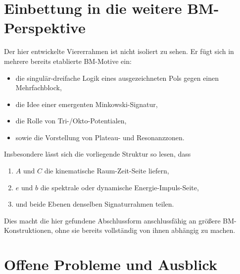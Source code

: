 \documentclass[11pt,a4paper]{article}
\theoremstyle{definition}
\theoremstyle{plain}
\begin{document}
	\section{Einbettung in die weitere BM-Perspektive}
	
	Der hier entwickelte Viererrahmen ist nicht isoliert zu sehen. Er fügt sich in mehrere bereits etablierte BM-Motive ein:
	\begin{itemize}[leftmargin=2em]
		\item die singulär-dreifache Logik eines ausgezeichneten Pols gegen einen Mehrfachblock,
		\item die Idee einer emergenten Minkowski-Signatur,
		\item die Rolle von Tri-/Okto-Potentialen,
		\item sowie die Vorstellung von Plateau- und Resonanzzonen.
	\end{itemize}
	
	Insbesondere lässt sich die vorliegende Struktur so lesen, dass
	\begin{enumerate}[leftmargin=2em]
		\item $A$ und $C$ die kinematische Raum-Zeit-Seite liefern,
		\item $e$ und $b$ die spektrale oder dynamische Energie-Impuls-Seite,
		\item und beide Ebenen denselben Signaturrahmen teilen.
	\end{enumerate}
	
	Dies macht die hier gefundene Abschlussform anschlussfähig an größere BM-Konstruktionen, ohne sie bereits vollständig von ihnen abhängig zu machen.
	
	\section{Offene Probleme und Ausblick}
	
\end{document}
